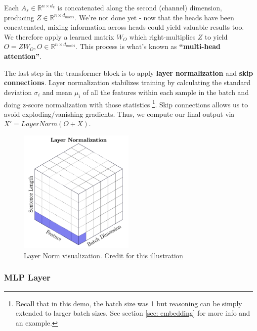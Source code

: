 \documentclass[12pt]{article}
\begin{document}
Each $A_s \in \mathbb{R}^{n \times d_{k}}$ is concatenated along the second (channel) dimension, producing $Z \in \mathbb{R}^{n \times d_{model}}$. We're not done yet - now that the heads have been concatenated, mixing information across heads could yield valuable results too. We therefore apply a learned matrix $W_O$ which right-multiplies $Z$ to yield $O = ZW_O, O \in \mathbb{R}^{n \times d_{model}}$. This process is what's known as \textbf{\enquote{multi-head attention}}. 

The last step in the transformer block is to apply \textbf{layer normalization} and \textbf{skip connections}. Layer normalization stabilizes training by calculating the standard deviation $\sigma_i$ and mean $\mu_i$ of all the features within each sample in the batch and doing z-score normalization with those statistics \footnote{Recall that in this demo, the batch size was 1 but reasoning can be simply extended to larger batch sizes. See section \ref{sec: embedding} for more info and an example.}. Skip connections allows us to avoid exploding/vanishing gradients. Thus, we compute our final output via $X' = LayerNorm(O + X)$. 

\begin{figure}[H]
    \centering
    \includegraphics[width=0.5\textwidth]{../media/layernorm.png}
    \caption{Layer Norm visualization. \href{https://proceedings.mlr.press/v119/shen20e/shen20e.pdf}{Credit for this illustration}}
    \label{fig:norms}
\end{figure}



\subsubsection{MLP Layer}

\end{document}
